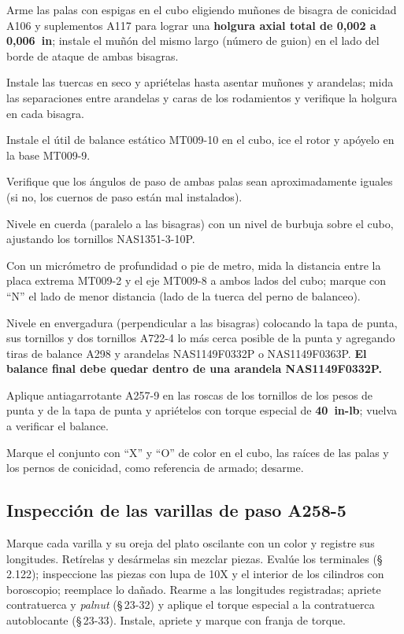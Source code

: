 \begin{pasos}
\item Arme las palas con espigas en el cubo eligiendo muñones de bisagra de conicidad A106 y suplementos A117 para lograr una \textbf{holgura axial total de 0,002 a 0,006~in}; instale el muñón del mismo largo (número de guion) en el lado del borde de ataque de ambas bisagras.
\item Instale las tuercas en seco y apriételas hasta asentar muñones y arandelas; mida las separaciones entre arandelas y caras de los rodamientos y verifique la holgura en cada bisagra.
\item Instale el útil de balance estático MT009-10 en el cubo, ice el rotor y apóyelo en la base MT009-9.
\item Verifique que los ángulos de paso de ambas palas sean aproximadamente iguales (si no, los cuernos de paso están mal instalados).
\item Nivele en cuerda (paralelo a las bisagras) con un nivel de burbuja sobre el cubo, ajustando los tornillos NAS1351-3-10P.
\item Con un micrómetro de profundidad o pie de metro, mida la distancia entre la placa extrema MT009-2 y el eje MT009-8 a ambos lados del cubo; marque con ``N'' el lado de menor distancia (lado de la tuerca del perno de balanceo).
\item Nivele en envergadura (perpendicular a las bisagras) colocando la tapa de punta, sus tornillos y dos tornillos A722-4 lo más cerca posible de la punta y agregando tiras de balance A298 y arandelas NAS1149F0332P o NAS1149F0363P. \textbf{El balance final debe quedar dentro de una arandela NAS1149F0332P.}
\item Aplique antiagarrotante A257-9 en las roscas de los tornillos de los pesos de punta y de la tapa de punta y apriételos con torque especial de \textbf{40~in-lb}; vuelva a verificar el balance.
\item Marque el conjunto con ``X'' y ``O'' de color en el cubo, las raíces de las palas y los pernos de conicidad, como referencia de armado; desarme.
\end{pasos}

\subsection{Inspección de las varillas de paso A258-5}

Marque cada varilla y su oreja del plato oscilante con un color y registre sus longitudes. Retírelas y desármelas sin mezclar piezas. Evalúe los terminales (\S\,2.122); inspeccione las piezas con lupa de 10X y el interior de los cilindros con boroscopio; reemplace lo dañado. Rearme a las longitudes registradas; apriete contratuerca y \emph{palnut} (\S\,23-32) y aplique el torque especial a la contratuerca autoblocante (\S\,23-33). Instale, apriete y marque con franja de torque.

